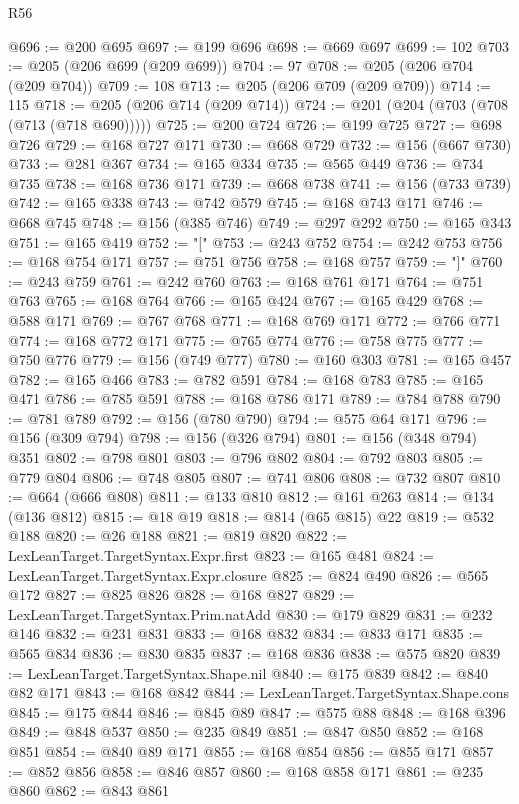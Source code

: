 \begin{lexlean}{R56}
\begin{coremodule}
{{{{{{{{{{{{{{{{{{{{{{{{{{{{{{{{{{{{{{{{{{{{{{{{{{{{{{{{{{{{{{{{{{{{{{{{{{{{{{{{{{{{{{{{{{{{{{{{{{{{{{{{{{{{{{{{{{{{{{{{{{{{{{{{{{{{{{{{{{{{{{{{{{{{{{{{{{{{{{{{{{{{{{{{{{{{{{{{{{{{{{{{{{{{{{{{{{{{{{{{{{{{{{{{{{{@696 := @200 @695
@697 := @199 @696
@698 := @669 @697
@699 := 102
@703 := @205 (@206 @699 (@209 @699))
@704 := 97
@708 := @205 (@206 @704 (@209 @704))
@709 := 108
@713 := @205 (@206 @709 (@209 @709))
@714 := 115
@718 := @205 (@206 @714 (@209 @714))
@724 := @201 (@204 (@703 (@708 (@713 (@718 @690)))))
@725 := @200 @724
@726 := @199 @725
@727 := @698 @726
@729 := @168 @727 @171
@730 := @668 @729
@732 := @156 (@667 @730)
@733 := @281 @367
@734 := @165 @334
@735 := @565 @449
@736 := @734 @735
@738 := @168 @736 @171
@739 := @668 @738
@741 := @156 (@733 @739)
@742 := @165 @338
@743 := @742 @579
@745 := @168 @743 @171
@746 := @668 @745
@748 := @156 (@385 @746)
@749 := @297 @292
@750 := @165 @343
@751 := @165 @419
@752 := "["
@753 := @243 @752
@754 := @242 @753
@756 := @168 @754 @171
@757 := @751 @756
@758 := @168 @757
@759 := "]"
@760 := @243 @759
@761 := @242 @760
@763 := @168 @761 @171
@764 := @751 @763
@765 := @168 @764
@766 := @165 @424
@767 := @165 @429
@768 := @588 @171
@769 := @767 @768
@771 := @168 @769 @171
@772 := @766 @771
@774 := @168 @772 @171
@775 := @765 @774
@776 := @758 @775
@777 := @750 @776
@779 := @156 (@749 @777)
@780 := @160 @303
@781 := @165 @457
@782 := @165 @466
@783 := @782 @591
@784 := @168 @783
@785 := @165 @471
@786 := @785 @591
@788 := @168 @786 @171
@789 := @784 @788
@790 := @781 @789
@792 := @156 (@780 @790)
@794 := @575 @64 @171
@796 := @156 (@309 @794)
@798 := @156 (@326 @794)
@801 := @156 (@348 @794) @351
@802 := @798 @801
@803 := @796 @802
@804 := @792 @803
@805 := @779 @804
@806 := @748 @805
@807 := @741 @806
@808 := @732 @807
@810 := @664 (@666 @808)
@811 := @133 @810
@812 := @161 @263
@814 := @134 (@136 @812)
@815 := @18 @19
@818 := @814 (@65 @815) @22
@819 := @532 @188
@820 := @26 @188
@821 := @819 @820
@822 := LexLeanTarget.TargetSyntax.Expr.first
@823 := @165 @481
@824 := LexLeanTarget.TargetSyntax.Expr.closure
@825 := @824 @490
@826 := @565 @172
@827 := @825 @826
@828 := @168 @827
@829 := LexLeanTarget.TargetSyntax.Prim.natAdd
@830 := @179 @829
@831 := @232 @146
@832 := @231 @831
@833 := @168 @832
@834 := @833 @171
@835 := @565 @834
@836 := @830 @835
@837 := @168 @836
@838 := @575 @820
@839 := LexLeanTarget.TargetSyntax.Shape.nil
@840 := @175 @839
@842 := @840 @82 @171
@843 := @168 @842
@844 := LexLeanTarget.TargetSyntax.Shape.cons
@845 := @175 @844
@846 := @845 @89
@847 := @575 @88
@848 := @168 @396
@849 := @848 @537
@850 := @235 @849
@851 := @847 @850
@852 := @168 @851
@854 := @840 @89 @171
@855 := @168 @854
@856 := @855 @171
@857 := @852 @856
@858 := @846 @857
@860 := @168 @858 @171
@861 := @235 @860
@862 := @843 @861
}}}}}}}}}}}}}}}}}}}}}}}}}}}}}}}}}}}}}}}}}}}}}}}}}}}}}}}}}}}}}}}}}}}}}}}}}}}}}}}}}}}}}}}}}}}}}}}}}}}}}}}}}}}}}}}}}}}}}}}}}}}}}}}}}}}}}}}}}}}}}}}}}}}}}}}}}}}}}}}}}}}}}}}}}}}}}}}}}}}}}}}}}}}}}}}}}}}}}}}}}}}}}}}}}}}
\end{coremodule}
\end{lexlean}
